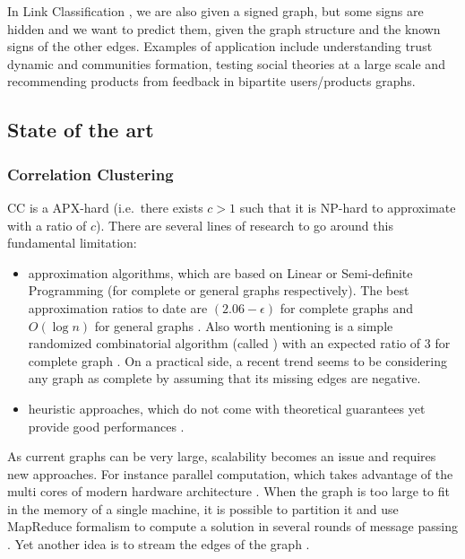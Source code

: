 In Link Classification \autocite{Leskovec2010}, we are also given a signed
graph, but some signs are hidden and we want to predict them, given the graph
structure and the known signs of the other edges. Examples of application
include understanding trust dynamic and communities formation, testing social
theories at a large scale and recommending products from feedback in bipartite
users/products graphs.

\subsection{State of the art}\label{state-of-the-art}

\subsubsection{Correlation Clustering}\label{correlation-clustering}

CC is a APX-hard (i.e.~there exists $c>1$ such that it is NP-hard to
approximate with a ratio of $c$). There are several lines of research to go
around this fundamental limitation:

\begin{itemize}
 \item

 approximation algorithms, which are based on Linear or Semi-definite
 Programming (for complete or general graphs respectively). The best
 approximation ratios to date are $(2.06 - \epsilon)$ for complete graphs
 \autocite{Chawla2014} and $O(\log n)$ for general graphs
 \autocite{Demaine2006}. Also worth mentioning is a simple randomized
 combinatorial algorithm (called \kwik{}) with an expected ratio of 3 for
 complete graph \autocite{Ailon2008}. On a practical side, a recent trend seems
 to be considering any graph as complete by assuming that its missing edges are
 negative.

 \item
 heuristic approaches, which do not come with theoretical guarantees
 yet provide good performances \autocites{Elsner2009}{Levorato2015}.
\end{itemize}

As current graphs can be very large, scalability becomes an issue and requires
new approaches. For instance parallel computation, which takes advantage of the
multi cores of modern hardware architecture \autocites{Pan2014}{Levorato2015}.
When the graph is too large to fit in the memory of a single machine, it is
possible to partition it and use MapReduce formalism to compute a solution in
several rounds of message passing \autocite{Chierichetti2014}. Yet another idea
is to stream the edges of the graph \autocite{Ahn2015}.

